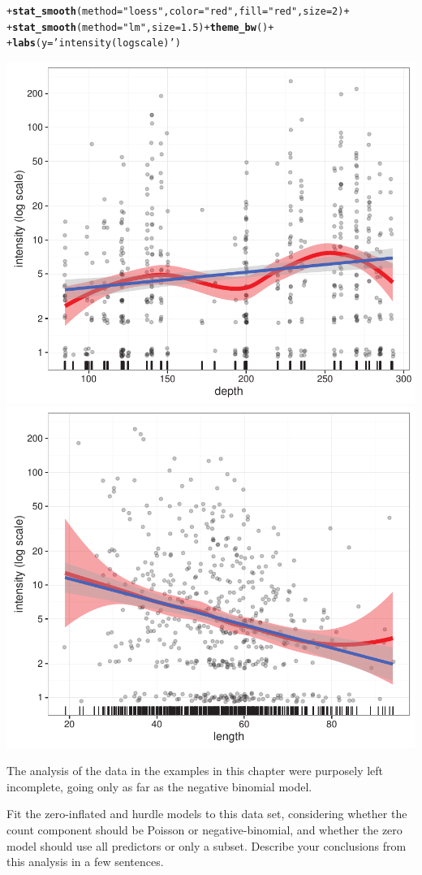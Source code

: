 \documentclass[10pt]{report}\usepackage[]{graphicx}\usepackage[]{color}
\makeatletter
\newcommand{\hlnum}[1]{\textcolor[rgb]{0.686,0.059,0.569}{#1}}%
\newcommand{\hlstr}[1]{\textcolor[rgb]{0.192,0.494,0.8}{#1}}%
\newcommand{\hlopt}[1]{\textcolor[rgb]{0,0,0}{#1}}%
\newcommand{\hlstd}[1]{\textcolor[rgb]{0.345,0.345,0.345}{#1}}%
\newcommand{\hlkwc}[1]{\textcolor[rgb]{0.333,0.667,0.333}{#1}}%
\newcommand{\hlkwd}[1]{\textcolor[rgb]{0.737,0.353,0.396}{\textbf{#1}}}%
\newenvironment{kframe}{%
 \def\at@end@of@kframe{}%
 \ifinner\ifhmode%
  \def\at@end@of@kframe{\end{minipage}}%
  \begin{minipage}{\columnwidth}%
 \fi\fi%
 \def\FrameCommand##1{\hskip\@totalleftmargin \hskip-\fboxsep
 \colorbox{shadecolor}{##1}\hskip-\fboxsep
     \hskip-\linewidth \hskip-\@totalleftmargin \hskip\columnwidth}%
 \MakeFramed {\advance\hsize-\width
   \@totalleftmargin\z@ \linewidth\hsize
   \@setminipage}}%
 {\par\unskip\endMakeFramed%
 \at@end@of@kframe}
\newenvironment{knitrout}{}{} %
\renewenvironment{knitrout}{\small\renewcommand{\baselinestretch}{.85}}{} %
\makeatother
\begin{document}
\begin{Exercises}
\begin{ans}
\begin{knitrout}
\begin{kframe}
\begin{alltt}
\hlstd{+ }        \hlkwd{stat_smooth}\hlstd{(}\hlkwc{method}\hlstd{=}\hlstr{"loess"}\hlstd{,} \hlkwc{color}\hlstd{=}\hlstr{"red"}\hlstd{,} \hlkwc{fill}\hlstd{=}\hlstr{"red"}\hlstd{,} \hlkwc{size}\hlstd{=}\hlnum{2}\hlstd{)} \hlopt{+}
\hlstd{+ }        \hlkwd{stat_smooth}\hlstd{(}\hlkwc{method}\hlstd{=}\hlstr{"lm"}\hlstd{,} \hlkwc{size}\hlstd{=}\hlnum{1.5}\hlstd{)} \hlopt{+} \hlkwd{theme_bw}\hlstd{()} \hlopt{+}
\hlstd{+ }        \hlkwd{labs}\hlstd{(}\hlkwc{y}\hlstd{=}\hlstr{'intensity (log scale)'}\hlstd{)}
\end{alltt}
\end{kframe}

\centerline{\includegraphics[width=.49\textwidth]{soln/fig/ex11_6b-1} 
\includegraphics[width=.49\textwidth]{soln/fig/ex11_6b-2} }



\end{knitrout}

  \end{ans}
  

  \exercise The analysis of the  data in the examples in this chapter were purposely left incomplete,
  going only as far as the negative binomial model.
  \begin{enumerate*}
    \item Fit the zero-inflated and hurdle models to this data set, considering whether the count component should
    be Poisson or negative-binomial, and whether the zero model should use all predictors or only a subset.
    Describe your conclusions from this analysis in a few sentences.
    \begin{ans}
    \end{ans}
    

\end{enumerate*}
\end{Exercises}
\end{document}
